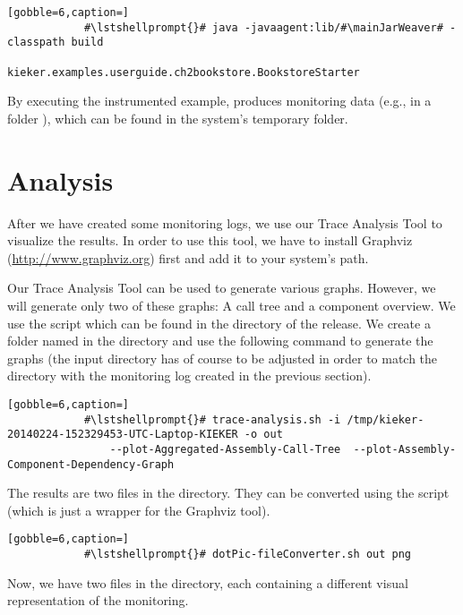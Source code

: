 		\setBashListing
		\begin{lstlisting}[gobble=6,caption=]			
			#\lstshellprompt{}# java -javaagent:lib/#\mainJarWeaver# -classpath build
			    kieker.examples.userguide.ch2bookstore.BookstoreStarter
		\end{lstlisting} 
		
		\noindent
		By executing the instrumented example, \Kieker{} produces monitoring data (e.g., in a folder ), which can be found in the system's temporary folder.
	
	\section{Analysis}
	
		After we have created some monitoring logs, we use our Trace Analysis Tool to visualize the results. In order to use this tool, we have to install Graphviz (\url{http://www.graphviz.org}) first and add it to your system's path. \\

		
		\noindent
		Our Trace Analysis Tool can be used to generate various graphs. However, we will generate only two of these graphs: A call tree and a component overview. We use the script  which can be found in the  directory of the release. We create a folder named  in the  directory and use the following command to generate the graphs (the input directory has of course to be adjusted in order to match the directory with the monitoring log created in the previous section).
		
		\setBashListing
		\begin{lstlisting}[gobble=6,caption=]			
			#\lstshellprompt{}# trace-analysis.sh -i /tmp/kieker-20140224-152329453-UTC-Laptop-KIEKER -o out 
			    --plot-Aggregated-Assembly-Call-Tree  --plot-Assembly-Component-Dependency-Graph
		\end{lstlisting} 
		
		\noindent
		The results are two  files in the  directory. They can be converted using the script  (which is just a wrapper for the Graphviz tool).
		
		\setBashListing
		\begin{lstlisting}[gobble=6,caption=]			
			#\lstshellprompt{}# dotPic-fileConverter.sh out png
		\end{lstlisting} 
		
		\noindent
		Now, we have two  files in the  directory, each containing a different visual representation of the monitoring.